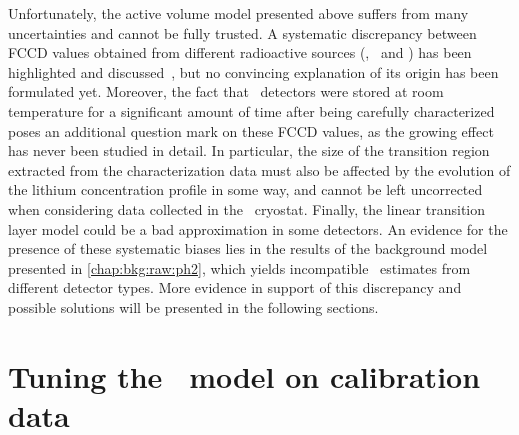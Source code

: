 Unfortunately, the active volume model presented above suffers from many uncertainties and
cannot be fully trusted. A systematic discrepancy between FCCD values obtained from
different radioactive sources (\Am, \Ba\ and \Co) has been highlighted and
discussed~\cite{Lehnert2016}, but no convincing explanation of its origin has been
formulated yet. Moreover, the fact that \bege\ detectors were stored at room temperature
for a significant amount of time after being carefully characterized poses an additional
question mark on these FCCD values, as the growing effect has never been studied
in detail. In particular, the size of the transition region extracted from the
characterization data must also be affected by the evolution of the lithium concentration
profile in some way, and cannot be left uncorrected when considering data collected in the
\gerda\ cryostat. Finally, the linear transition layer model could be a bad approximation
in some detectors. An evidence for the presence of these systematic biases lies in the
results of the background model presented in \cref{chap:bkg:raw:ph2}, which yields
incompatible \thalftwo\ estimates from different detector types. More evidence in support
of this discrepancy and possible solutions will be presented in the following sections.

\section{Tuning the \bege\ model on calibration data}%
\label{sec:gedetav:calib-optim}

